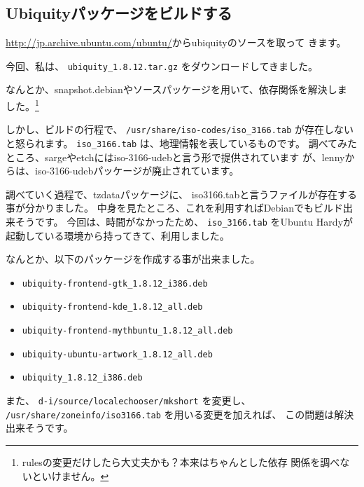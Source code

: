 \documentclass[mingoth,a4paper]{jsarticle}
\begin{document}


\subsection{Ubiquityパッケージをビルドする}

\url{http://jp.archive.ubuntu.com/ubuntu/}からubiquityのソースを取って
きます。

今回、私は、
{\tt ubiquity\_1.8.12.tar.gz}
をダウンロードしてきました。

なんとか、snapshot.debianやソースパッケージを用いて、依存関係を解決しま
した。\footnote{rulesの変更だけしたら大丈夫かも？本来はちゃんとした依存
関係を調べないといけません。}

しかし、ビルドの行程で、
{\tt /usr/share/iso-codes/iso\_3166.tab}
が存在しないと怒られます。
{\tt iso\_3166.tab}
は、地理情報を表しているものです。
調べてみたところ、sargeやetchにはiso-3166-udebと言う形で提供されています
が、lennyからは、iso-3166-udebパッケージが廃止されています。

調べていく過程で、tzdataパッケージに、
iso3166.tabと言うファイルが存在する事が分かりました。
中身を見たところ、これを利用すればDebianでもビルド出来そうです。
今回は、時間がなかったため、
{\tt iso\_3166.tab}
をUbuntu Hardyが起動している環境から持ってきて、利用しました。

なんとか、以下のパッケージを作成する事が出来ました。
\begin{itemize}
 \item {\tt ubiquity-frontend-gtk\_1.8.12\_i386.deb}
 \item {\tt ubiquity-frontend-kde\_1.8.12\_all.deb}
 \item {\tt ubiquity-frontend-mythbuntu\_1.8.12\_all.deb}
 \item {\tt ubiquity-ubuntu-artwork\_1.8.12\_all.deb}
 \item {\tt ubiquity\_1.8.12\_i386.deb}
\end{itemize}

また、
{\tt d-i/source/localechooser/mkshort}
を変更し、
{\tt /usr/share/zoneinfo/iso3166.tab}
を用いる変更を加えれば、
この問題は解決出来そうです。
\end{document}
